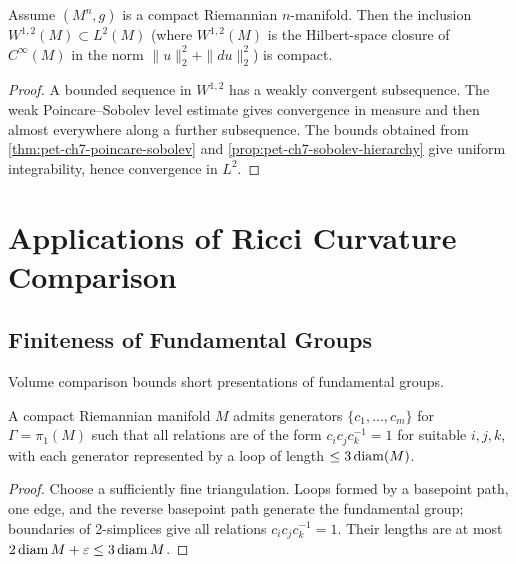 \begin{theorem}
  \label{thm:pet-ch7-rellich-compactness}
  Assume $(M^n,g)$ is a compact Riemannian $n$-manifold. Then the inclusion
  $W^{1,2}(M)\subset L^2(M)$ (where $W^{1,2}(M)$ is the Hilbert-space closure
  of $C^\infty(M)$ in the norm $\|u\|_2^2+\|du\|_2^2$) is compact.
\end{theorem}
\begin{proof}
  \sketch
  A bounded sequence in \(W^{1,2}\) has a weakly convergent subsequence. The weak Poincare--Sobolev level estimate gives convergence in measure and then almost everywhere along a further subsequence. The bounds obtained from \cref{thm:pet-ch7-poincare-sobolev} and \cref{prop:pet-ch7-sobolev-hierarchy} give uniform integrability, hence convergence in \(L^2\).
\end{proof}

\section{Applications of Ricci Curvature Comparison}

\subsection{Finiteness of Fundamental Groups}

Volume comparison bounds short presentations of fundamental groups.

\begin{lemma}
  \label{lem:pet-ch7-gromov-generators}
  A compact Riemannian manifold $M$ admits generators $\{c_1,\dots,c_m\}$ for
  $\Gamma=\pi_1(M)$ such that all relations are of the form
  $c_ic_jc_k^{-1}=1$ for suitable $i,j,k$, with each generator represented by a
  loop of length $\le3\operatorname{diam}(M)$.
\end{lemma}
\begin{proof}
  \sketch
  Choose a sufficiently fine triangulation. Loops formed by a basepoint path, one edge, and the reverse basepoint path generate the fundamental group; boundaries of 2-simplices give all relations \(c_ic_jc_k^{-1}=1\). Their lengths are at most \(2\operatorname{diam} M+\varepsilon\le3\operatorname{diam} M\).
\end{proof}

